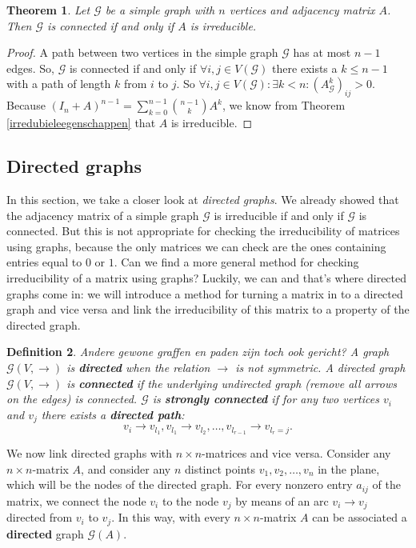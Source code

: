 \documentclass[a4paper,11pt]{report}
\newtheorem{theorem}{Theorem}[section]
\newtheorem{definition}[theorem]{Definition}
\newcommand{\graf}{\mathscr{G}}
\begin{document}
 \begin{theorem}
   Let $\graf$ be a simple graph with $n$ vertices and adjacency matrix $A$. 
   Then $\graf$ is connected if and only if $A$ is irreducible.
 \end{theorem}
 
 \begin{proof}
   A path between two vertices in the simple graph $\graf$ has at most $n-1$ 
   edges. So, $\graf$ is connected if and only if $\forall i, j \in V(\graf)$ there exists 
   a $k \leq n- 1$ with a path of length $k$ from $i$ to $j$. So $\forall i, j \in V(\graf): \exists k < n: (A^k_\graf)_{ij} > 
   0$. Because $(I_n + A)^{n-1} = \sum^{n-1}_{k=0}{n-1 \choose k}A^k$, we know from Theorem \ref{irredubieleegenschappen} that
$A$ is irreducible.   
 \end{proof}
\subsection{Directed graphs}
In this section, we take a closer look at \emph{directed graphs}. We already 
showed that the adjacency matrix of a simple graph $\graf$ is irreducible if and only 
if $\graf$ is connected. But this is not appropriate for checking the irreducibility 
of matrices using graphs, because the only matrices we can check
are the ones containing entries equal to $0$ or $1$. Can we find a more general method for checking irreducibility of 
a matrix using graphs? Luckily, we can and that's where directed graphs come 
in: we will introduce a method for turning a matrix in to a directed graph 
and vice versa and link the irreducibility of this matrix to a property of the 
directed graph.
\begin{definition}
  Andere gewone graffen en paden zijn toch ook gericht?
  A graph $\graf(V,\to)$ is \textbf{directed} when the relation $\to$ is not symmetric.
    A directed graph $\graf(V, \to)$ is \textbf{connected} if the underlying undirected graph
  (remove all arrows on the edges) is connected. $\graf$ is \textbf{strongly connected} if for any two
  vertices $v_i$ and $v_j$ there exists a \textbf{directed path}:
  $$v_i \rightarrow v_{l_1}, v_{l_1} \rightarrow v_{l_2}, \ldots, v_{l_{r-1}} 
  \rightarrow v_{l_r = j}.$$

 \end{definition}

We now link directed graphs with $n \times n$-matrices and vice versa. Consider any $n \times n$-matrix $A$, and consider any $n$ distinct 
points $v_1, v_2,\ldots,v_n$ in the plane, which will be the nodes of the directed graph. 
For every nonzero entry $a_{ij}$ of the matrix, we connect the node $v_i$ to the 
node $v_j$ by means of an arc $v_i \rightarrow v_j$ directed from $v_i$ to 
$v_j$. In this way, with every $n \times n$-matrix $A$ can be associated a \textbf{directed} 
graph $\graf(A)$.
\end{document}
